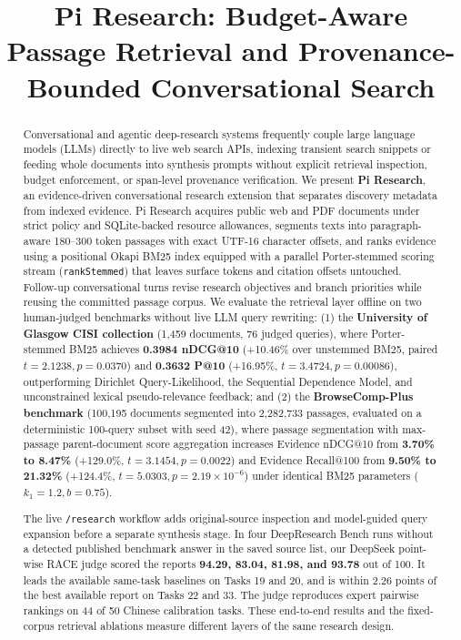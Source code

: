 \documentclass[conference]{IEEEtran}
\title{Pi Research: Budget-Aware Passage Retrieval and Provenance-Bounded Conversational Search}
\author{
\IEEEauthorblockN{Ayan Pande, Riya Arora, and Abhyudaya Vasisht}
\IEEEauthorblockA{\textit{Department of Computer Science and Engineering, Shiv Nadar University}\\
CSD358 Information Retrieval (Track T2: Conversational and Agentic Search)\\
Instructor: Dr. Sonia Khetarpaul \quad $\cdot$ \quad November 2026\\
\href{https://github.com/CloudedQuartz/pi-research}{Source code, evaluation, and artifacts: CloudedQuartz/pi-research}}
}
\begin{document}
\maketitle

\begin{abstract}
Conversational and agentic deep-research systems frequently couple large language models (LLMs) directly to live web search APIs, indexing transient search snippets or feeding whole documents into synthesis prompts without explicit retrieval inspection, budget enforcement, or span-level provenance verification. We present \textbf{Pi Research}, an evidence-driven conversational research extension that separates discovery metadata from indexed evidence. Pi Research acquires public web and PDF documents under strict policy and SQLite-backed resource allowances, segments texts into paragraph-aware 180--300 token passages with exact UTF-16 character offsets, and ranks evidence using a positional Okapi BM25 index equipped with a parallel Porter-stemmed scoring stream (\texttt{rankStemmed}) that leaves surface tokens and citation offsets untouched. Follow-up conversational turns revise research objectives and branch priorities while reusing the committed passage corpus. We evaluate the retrieval layer offline on two human-judged benchmarks without live LLM query rewriting: (1) the \textbf{University of Glasgow CISI collection} (1,459 documents, 76 judged queries), where Porter-stemmed BM25 achieves \textbf{0.3984 nDCG@10} (+10.46\% over unstemmed BM25, paired $t = 2.1238, p = 0.0370$) and \textbf{0.3632 P@10} (+16.95\%, $t = 3.4724, p = 0.00086$), outperforming Dirichlet Query-Likelihood, the Sequential Dependence Model, and unconstrained lexical pseudo-relevance feedback; and (2) the \textbf{BrowseComp-Plus benchmark} (100,195 documents segmented into 2,282,733 passages, evaluated on a deterministic 100-query subset with seed 42), where passage segmentation with max-passage parent-document score aggregation increases Evidence nDCG@10 from \textbf{3.70\% to 8.47\%} (+129.0\%, $t = 3.1454, p = 0.0022$) and Evidence Recall@100 from \textbf{9.50\% to 21.32\%} (+124.4\%, $t = 5.0303, p = 2.19 \times 10^{-6}$) under identical BM25 parameters ($k_1 = 1.2, b = 0.75$).

The live \texttt{/research} workflow adds original-source inspection and model-guided query expansion before a separate synthesis stage. In four DeepResearch Bench runs without a detected published benchmark answer in the saved source list, our DeepSeek point-wise RACE judge scored the reports \textbf{94.29, 83.04, 81.98, and 93.78} out of 100. It leads the available same-task baselines on Tasks 19 and 20, and is within 2.26 points of the best available report on Tasks 22 and 33. The judge reproduces expert pairwise rankings on 44 of 50 Chinese calibration tasks. These end-to-end results and the fixed-corpus retrieval ablations measure different layers of the same research design.
\end{abstract}
\end{document}
